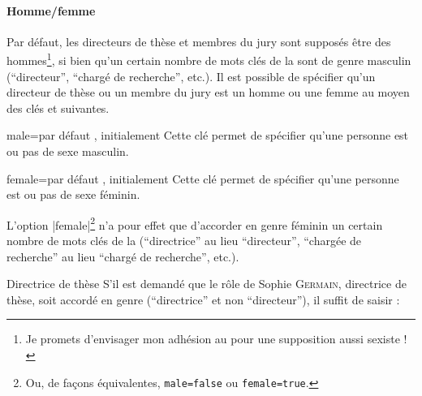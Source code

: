 \paragraph{Homme/femme}
\label{sec-hommefemme}%
%
%

%
%
Par défaut, les directeurs de thèse et membres du jury sont supposés être des
hommes\footnote{Je promets d'envisager mon adhésion au  pour une
  supposition aussi sexiste !}, si bien qu'un certain nombre de mots clés de la
\yatCl{} sont de genre masculin (\enquote{directeur}, \enquote{chargé de
  recherche}, etc.). Il est possible de spécifier qu'un directeur de thèse ou
un membre du jury est un homme ou une femme au moyen des clés  et
 suivantes.

\begin{docKey}{male}{=\textbar{}}{par défaut
    , initialement }
  Cette clé permet de spécifier qu'une personne est ou pas de sexe masculin.
\end{docKey}

\begin{docKey}{female}{=\textbar{}}{par défaut
    , initialement }
  Cette clé permet de spécifier qu'une personne est ou pas de sexe féminin.
\end{docKey}

L'option |female|\footnote{Ou, de façons équivalentes,
  \protect\lstinline+male=false+ ou \protect\lstinline+female=true+.} n'a pour
effet que d'accorder en genre féminin un certain nombre de mots clés de la
\yatCl{} (\enquote{directrice} au lieu \enquote{directeur}, \enquote{chargée de
  recherche} au lieu \enquote{chargé de recherche}, etc.).

\begin{dbexample}{Directrice de thèse}{}
  S'il est demandé que le rôle de Sophie \textsc{Germain}, directrice de thèse,
  soit accordé en genre (\enquote{directrice} et non \enquote{directeur}), il
  suffit de saisir :
\begin{preamblecode}[listing options={deletekeywords={[5]supervisor}}]
\end{preamblecode}
\end{dbexample}

